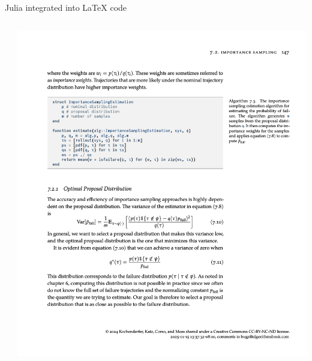 \begin{frame}[fragile]{Julia integrated into \LaTeX{} code}
\begin{columns}
\begin{column}{0.33\textwidth}
\begin{minipage}[t]{\linewidth}
    \end{minipage}
  \end{column}
  \pause
  \begin{column}{0.33\textwidth}
    \centering
    \includegraphics[width=\linewidth]{media/val-pg147.png}
    
  \end{column}
  \hfill
\end{columns}

\end{frame}